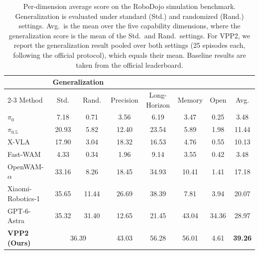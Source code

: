 \begin{table}[h]
\centering
\small
\setlength{\tabcolsep}{3.5pt}
\begin{tabular}{lccccccc}
\toprule
 & \multicolumn{2}{c}{Generalization} & & & & & \\
\cmidrule(lr){2-3}
Method & Std. & Rand. & Precision & Long-Horizon & Memory & Open & Avg. \\
\midrule
$\pi_0$~\citep{black2024pi_0} & 7.18 & 0.71 & 3.56 & 6.19 & 3.47 & 0.25 & 3.48 \\
$\pi_{0.5}$~\citep{intelligence2025pi_} & 20.93 & 5.82 & 12.40 & 23.54 & 5.89 & 1.98 & 11.44 \\
X-VLA~\citep{zheng2026xvla} & 17.90 & 3.04 & 18.32 & 16.53 & 4.76 & 0.55 & 10.13 \\
Fast-WAM~\citep{yuan2026fastwam} & 4.33 & 0.34 & 1.96 & 9.14 & 3.55 & 0.42 & 3.48 \\
OpenWAM-$\alpha$~\citep{wang2026openwam} & 33.16 & 8.26 & 18.45 & 34.93 & 10.41 & 1.41 & 17.18 \\
Xiaomi-Robotics-1~\citep{guo2026xiaomirobotics1} & 35.65 & 11.44 & 26.69 & 38.39 & 7.81 & 3.94 & 20.07 \\
GPT-6-Astra~\citep{zhang2026astra} & 35.32 & 31.40 & 12.65 & 21.45 & 43.04 & 34.36 & 28.97 \\
\midrule
\textbf{VPP2 (Ours)} & \multicolumn{2}{c}{36.39} & 43.03 & 56.28 & 56.01 & 4.61 & \textbf{39.26} \\
\bottomrule
\end{tabular}
\caption{Per-dimension average score on the RoboDojo simulation benchmark. Generalization is evaluated under standard (Std.) and randomized (Rand.) settings. Avg.\ is the mean over the five capability dimensions, where the generalization score is the mean of the Std.\ and Rand.\ settings. For VPP2, we report the generalization result pooled over both settings (25 episodes each, following the official protocol), which equals their mean. Baseline results are taken from the official leaderboard.}
\label{tab:app_robodojo_score}
\end{table}

